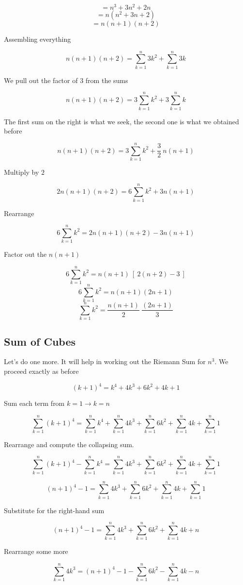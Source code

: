 \documentclass[11pt, oneside]{article}
\begin{document}
\[ = n^3 + 3n^2 + 2n \]
\[ = n(n^2 + 3n + 2) \]
\[ = n(n+1)(n+2) \]

Assembling everything

\[ n(n+1)(n+2) = \sum_{k=1}^n 3k^2 + \sum_{k=1}^n 3k \]

We pull out the factor of $3$ from the sums

\[ n(n+1)(n+2) = 3\sum_{k=1}^n k^2 + 3\sum_{k=1}^n k  \]

The first sum on the right is what we seek, the second one is what we obtained before

\[ n(n+1)(n+2) = 3\sum_{k=1}^n k^2 + \frac{3}{2}\ n(n+1) \]

Multiply by $2$

\[ 2n(n+1)(n+2) = 6\sum_{k=1}^n k^2 + 3n(n+1) \]

Rearrange

\[ 6\sum_{k=1}^n k^2 = 2n(n+1)(n+2) - 3n(n+1) \]

Factor out the $n(n+1)$

\[ 6\sum_{k=1}^n k^2 = n(n+1) \ [ \ 2(n + 2) - 3 \ ] \]
\[ 6\sum_{k=1}^n k^2 = n(n+1)(2n + 1) \]
\[ \sum_{k=1}^n k^2 = \frac{n(n+1)}{2} \ \frac{(2n + 1)}{3}  \]

\subsection*{Sum of Cubes}

Let's do one more.  It will help in working out the Riemann Sum for $n^3$.  We proceed exactly as before

\[ (k+1)^4 = k^4 + 4k^3 + 6k^2 + 4k + 1 \]

Sum each term from $k=1 \rightarrow k=n$

\[ \sum_{k=1}^n (k+1)^4 = \sum_{k=1}^n k^4 + \sum_{k=1}^n 4k^3 + \sum_{k=1}^n 6k^2 + \sum_{k=1}^n 4k + \sum_{k=1}^n 1 \]

Rearrange and compute the collapsing sum.

\[ \sum_{k=1}^n (k+1)^4 - \sum_{k=1}^n k^4 = \sum_{k=1}^n 4k^3 + \sum_{k=1}^n 6k^2 + \sum_{k=1}^n 4k + \sum_{k=1}^n 1 \]

\[ (n+1)^4 - 1 = \sum_{k=1}^n 4k^3 + \sum_{k=1}^n 6k^2 + \sum_{k=1}^n 4k + \sum_{k=1}^n 1 \]

Substitute for the right-hand sum

\[ (n+1)^4 - 1 = \sum_{k=1}^n 4k^3 + \sum_{k=1}^n 6k^2 + \sum_{k=1}^n 4k + n \]

Rearrange some more

\[ \sum_{k=1}^n 4k^3 = (n+1)^4 - 1 - \sum_{k=1}^n 6k^2 - \sum_{k=1}^n 4k - n \]
\end{document}
